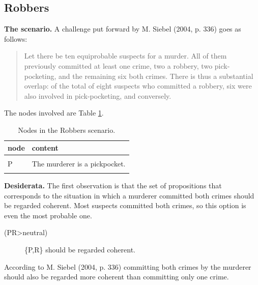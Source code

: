 \documentclass[
  10pt,
]{scrartcl}
\newcommand{\s}[1]{\textsf{#1}}
\begin{document}
\hypertarget{robbers}{%
\subsection{Robbers}\label{robbers}}

\textbf{The scenario.} A challenge put forward by M. Siebel (2004, p. 336) goes as follows:

\begin{quote}
    Let there be ten equiprobable suspects for a murder. All of them previously committed at least one crime, two a robbery, two pick-pocketing, and the remaining six both crimes. There is thus a substantial overlap: of the total of eight suspects who committed a robbery, six were also involved in pick-pocketing, and conversely. 
\end{quote}

\noindent The nodes involved are Table \ref{tab:robbersPropositions}.

\begin{table}[H]

\caption{\label{tab:robbersPropositions}Nodes in the Robbers scenario.}
\centering
\begin{tabular}[t]{ll}
\toprule
node & content\\
\midrule
\cellcolor{gray!6}{W} & \cellcolor{gray!6}{Real perpetrator status (three possible states).}\\
P & The murderer is a pickpocket.\\
\cellcolor{gray!6}{R} & \cellcolor{gray!6}{The murderer is a robber.}\\
\bottomrule
\end{tabular}
\end{table}

\noindent  \textbf{Desiderata.} The first observation is that the set of propositions that corresponds to the situation in which a murderer committed both crimes should be regarded coherent. Most suspects committed both crimes, so this option is even the most probable one.
\vspace{2mm}

\begin{description}
    \item[(\s{PR}\textgreater \s{neutral})] \{\s{P,R}\} should be regarded coherent. 
\end{description}\vspace{2mm}

According to M. Siebel (2004, p. 336) committing both crimes by the murderer should also be regarded more coherent than committing only one crime.
\vspace{2mm}
\end{document}
